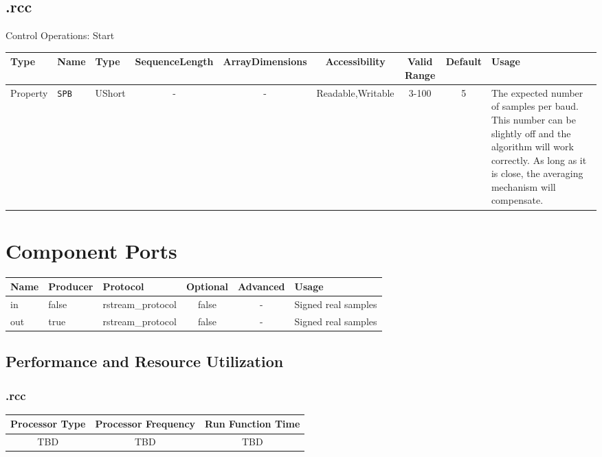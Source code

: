 \begin{landscape}
	\subsection*{\comp.rcc}
	Control Operations: Start\newline\newline
	\begin{scriptsize}
		\begin{tabular}{|p{3cm}|p{2cm}|p{1cm}|c|c|c|c|c|p{5cm}|}
			\hline
			\rowcolor{blue}
			Type     & Name       & Type   & SequenceLength & ArrayDimensions & Accessibility     & Valid Range & Default & Usage                                                                                                                                                                             \\
			\hline
			Property & \verb+SPB+ & UShort & -              & -               & Readable,Writable & 3-100       & 5       & The expected number of samples per baud.  This number can be slightly off and the algorithm will work correctly. As long as it is close, the averaging mechanism will compensate. \\
			\hline
		\end{tabular}
	\end{scriptsize}

	\section*{Component Ports}
	\begin{scriptsize}
		\begin{tabular}{|M{2cm}|M{1.5cm}|M{4cm}|c|c|M{9cm}|}
			\hline
			\rowcolor{blue}
			Name & Producer & Protocol          & Optional & Advanced & Usage               \\
			\hline
			in   & false    & rstream\_protocol & false    & -        & Signed real samples \\
			\hline
			out  & true     & rstream\_protocol & false    & -        & Signed real samples \\
			\hline
		\end{tabular}
	\end{scriptsize}
\end{landscape}

\begin{landscape}
\section*{Performance and Resource Utilization}
\subsubsection*{\comp.rcc}
\begin{scriptsize}
	\begin{tabular}{|c|c|c|}
		\hline
		Processor Type & Processor Frequency & Run Function Time \\
		\hline
		TBD            & TBD                 & TBD               \\
		\hline
	\end{tabular}
\end{scriptsize}
\end{landscape}

